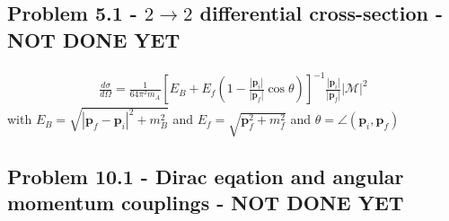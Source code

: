 \documentclass[../main.tex]{subfiles}
\begin{document}
\subsection{Problem 5.1 - $2\rightarrow2$ differential cross-section - NOT DONE YET}
\begin{align}
\frac{d\sigma}{d\Omega}=\frac{1}{64\pi^2m_A}\left[E_B+E_f\left(1-\frac{|\mathbf{p}_i|}{|\mathbf{p}_f|}\cos\theta\right)\right]^{-1}\frac{|\mathbf{p}_i|}{|\mathbf{p}_f|}|\mathcal{M}|^2
\end{align}
with $E_B=\sqrt{|\mathbf{p}_f-\mathbf{p}_i|^2+m_B^2}$ and $E_f=\sqrt{\mathbf{p}_f^2+m_f^2}$ and $\theta=\angle(\mathbf{p}_i,\mathbf{p}_f)$

\subsection{Problem 10.1 - Dirac eqation and angular momentum couplings - NOT DONE YET}
\end{document}
